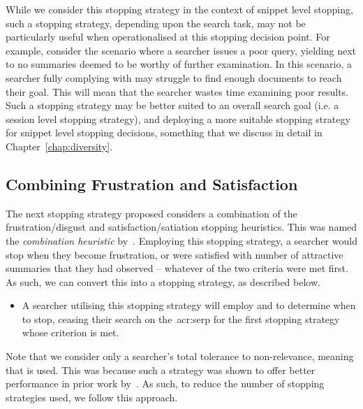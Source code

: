 While we consider this stopping strategy in the context of snippet level stopping, such a stopping strategy, depending upon the search task, may not be particularly useful when operationalised at this stopping decision point. For example, consider the scenario where a searcher issues a poor query, yielding next to no summaries deemed to be worthy of further examination. In this scenario, a searcher fully complying with  may struggle to find enough documents to reach their goal. This will mean that the searcher wastes time examining poor results. Such a stopping strategy may be better suited to an overall search goal (i.e. a session level stopping strategy), and deploying a more suitable stopping strategy for snippet level stopping decisions, something that we discuss in detail in Chapter~\ref{chap:diversity}.

\subsection{Combining Frustration and Satisfaction}
The next stopping strategy proposed considers a combination of the frustration/disgust and satisfaction/satiation stopping heuristics. This was named the \emph{combination heuristic} by~\cite{kraft1979stopping_rules}. Employing this stopping strategy, a searcher would stop when they become frustration, or were satisfied with number of attractive summaries that they had observed -- whatever of the two criteria were met first. As such, we can convert this into a stopping strategy, as described below.

\begin{itemize}
    \item{ A searcher utilising this stopping strategy will employ  and  to determine when to stop, ceasing their search on the~\gls{acr:serp} for the first stopping strategy whose criterion is met.}
\end{itemize}

Note that we consider only a searcher's total tolerance to non-relevance, meaning that  is used. This was because such a strategy was shown to offer better performance in prior work by~\cite{maxwell2015stopping_strategies}. As such, to reduce the number of stopping strategies used, we follow this approach.

